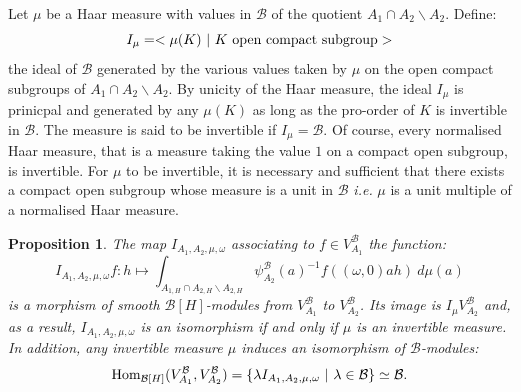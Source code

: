 \documentclass[11pt]{article}
\theoremstyle{plain}
\newtheorem{prop}[theo]{Proposition}
\theoremstyle{definition}
\theoremstyle{plain}
\theoremstyle{definition}
\theoremstyle{plain}
\begin{document}
Let $\mu$ be a Haar measure with values in $\mathcal{B}$ of the quotient $A_1 \cap A_2 \backslash A_2$. Define:
$$I_\mu = < \mu(K) \ | \ K \textup{ open compact subgroup}>$$
the ideal of $\mathcal{B}$ generated by the various values taken by $\mu$ on the open compact subgroups of $A_1 \cap A_2 \backslash A_2$. By unicity of the Haar measure, the ideal $I_\mu$ is prinicpal and generated by any $\mu(K)$ as long as the pro-order of $K$ is invertible in $\mathcal{B}$. The measure is said to be invertible if $I_\mu = \mathcal{B}$. Of course, every normalised Haar measure, that is a measure taking the value $1$ on a compact open subgroup, is invertible. For $\mu$ to be invertible, it is necessary and sufficient that there exists a compact open subgroup whose measure is a unit in $\mathcal{B}$ \textit{i.e.} $\mu$ is a unit multiple of a normalised Haar measure.

\begin{prop} \label{intertwining_maps_models_A1_A2_prop} The map $I_{A_1,A_2,\mu,\omega}$ associating to $f \in V_{A_1}^\mathcal{B}$ the function:
$$I_{A_1,A_2,\mu,\omega}f : h \longmapsto \int_{A_{1,H} \cap A_{2,H} \backslash A_{2,H}} \psi_{A_2}^\mathcal{B}(a)^{-1} f((\omega,0) a h) \ d\mu(a)$$
is a morphism of smooth $\mathcal{B}[H]$-modules from $V_{A_1}^\mathcal{B}$ to $V_{A_2}^\mathcal{B}$. Its image is $I_{\mu} V_{A_2}^\mathcal{B}$ and, as a result, $I_{A_1,A_2,\mu,\omega}$ is an isomorphism if and only if $\mu$ is an invertible measure. In addition, any invertible measure $\mu$ induces an isomorphism of $\mathcal{B}$-modules:
$$\textup{Hom}_{\mathcal{B}[H]}(V_{A_1}^\mathcal{B},V_{A_2}^\mathcal{B}) = \{ \lambda I_{A_1,A_2,\mu,\omega} \ | \ \lambda \in \mathcal{B} \} \simeq \mathcal{B}.$$ \end{prop}
\end{document}
